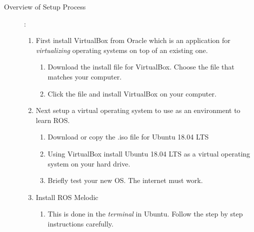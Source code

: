 \documentclass[12pt]{article}
\begin{document}
\begin{description}
\begin{itemize}
            \end{itemize}

		\item[Overview of Setup Process]: \vspace{0mm} \\
\begin{enumerate}

					\item First install VirtualBox from Oracle which is an application for {\it virtualizing} operating systems on top of an existing one.         
					      \begin{enumerate}
                            \item Download the install file for VirtualBox. Choose the file that matches your computer. 
                            
                              
                            \item Click the file and install VirtualBox on your computer.
                            
                        \end{enumerate} 
                    \item Next setup a virtual operating system to use as an environment to learn ROS. 
                        \begin{enumerate}
                            \item Download or copy the .iso file for Ubuntu 18.04 LTS 
                            \item Using VirtualBox install Ubuntu 18.04 LTS as a virtual operating system on your hard drive. 
                            \item Briefly test your new OS. The internet must work.        
                        \end{enumerate}
                    \item Install ROS Melodic
                        \begin{enumerate}
                            \item This is done in the {\it terminal} in Ubuntu. Follow the step by step instructions carefully.
                        \end{enumerate}
                    

\end{enumerate}
\end{description}
\end{document}
